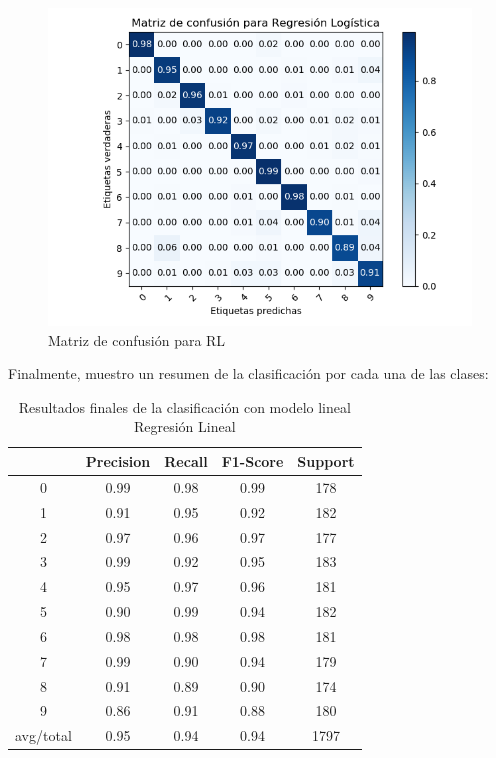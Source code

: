 \begin{figure}[H] %
	\centering
	\includegraphics[scale=0.8]{conf-m-rl.png}  %
	\caption{Matriz de confusión para RL} 
	\label{fig:conf-m-rl}
\end{figure}

Finalmente, muestro un resumen de la clasificación por cada una de las clases:

\begin{table}[H]
	\centering
	\begin{tabular}{|c|c|c|c|c|}
		\hline
		& Precision & Recall & F1-Score & Support \\ \hline
		0         & 0.99      & 0.98   & 0.99     & 178     \\ \hline
		1         & 0.91      & 0.95   & 0.92     & 182     \\ \hline
		2         & 0.97      & 0.96   & 0.97     & 177     \\ \hline
		3         & 0.99      & 0.92   & 0.95     & 183     \\ \hline
		4         & 0.95      & 0.97   & 0.96     & 181     \\ \hline
		5         & 0.90      & 0.99   & 0.94     & 182     \\ \hline
		6         & 0.98      & 0.98   & 0.98     & 181     \\ \hline
		7         & 0.99      & 0.90   & 0.94     & 179     \\ \hline
		8         & 0.91      & 0.89   & 0.90     & 174     \\ \hline
		9         & 0.86      & 0.91   & 0.88     & 180     \\ \hline
		avg/total & 0.95      & 0.94   & 0.94     & 1797    \\ \hline
	\end{tabular}
	\caption{Resultados finales de la clasificación con modelo lineal Regresión Lineal}
\end{table}

